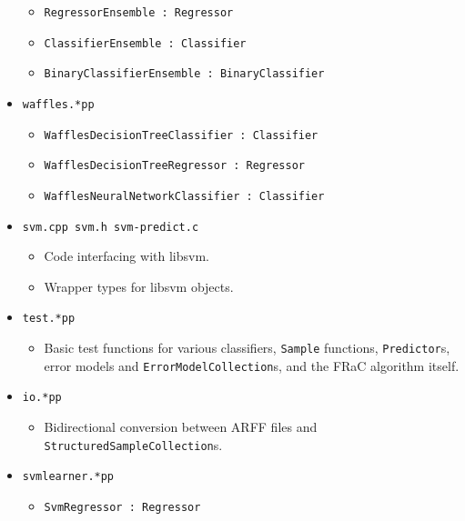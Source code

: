 \documentclass{article}
\newcommand{\extends}[1]{ : \textcolor{superclass}{#1}}
\newcommand{\filename}[1]{\texttt{\color{filename}#1}}
\begin{document}
\begin{multicols}{2}
\begin{itemize}
\begin{itemize}
\item \texttt{RegressorEnsemble\extends{Regressor}}
\item \texttt{ClassifierEnsemble\extends{Classifier}}
\item \texttt{BinaryClassifierEnsemble\extends{BinaryClassifier}}
\end{itemize}
\item \filename{waffles.*pp}
\begin{itemize}
\item \texttt{WafflesDecisionTreeClassifier\extends{Classifier}}
\item \texttt{WafflesDecisionTreeRegressor\extends{Regressor}}
\item \texttt{WafflesNeuralNetworkClassifier\extends{Classifier}}
\end{itemize}
\item \filename{svm.cpp svm.h svm-predict.c}
\begin{itemize}
\item Code interfacing with libsvm.
\item Wrapper types for libsvm objects.
\end{itemize}
\item \filename{test.*pp}
\begin{itemize}
\item Basic test functions for various classifiers, \texttt{Sample} functions, \texttt{Predictor}s, error models and \texttt{ErrorModelCollection}s, and the FRaC algorithm itself.
\end{itemize}
\item \filename{io.*pp}
\begin{itemize}
\item Bidirectional conversion between ARFF files and \texttt{StructuredSampleCollection}s.
\end{itemize}
\item \filename{svmlearner.*pp}
\begin{itemize}
\item \texttt{SvmRegressor\extends{Regressor}}
\end{itemize}

\end{itemize}
\end{multicols}
\end{document}
